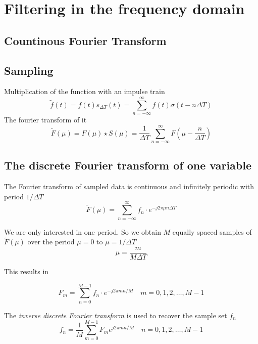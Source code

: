 \section{Filtering in the frequency domain }
\subsection{Countinous Fourier Transform }
\subsection{Sampling }
Multiplication of the function with an impulse train
\begin{equation}
\tilde{f}(t) = f(t) s_{\Delta T}(t) = \sum_{n=-\infty}^{\infty}f(t)\sigma (t-n \Delta T)
\end{equation}
The fourier transform of it
\begin{equation}
\tilde{F}(\mu) = F(\mu) \star S(\mu) = \frac{1}{\Delta T} \sum_{n=-\infty}^{\infty}F\left(\mu - \frac{n}{\Delta T}\right)
\end{equation}

\subsection{The discrete Fourier transform of one variable }
The Fourier transform of sampled data is continuous and infinitely periodic with period $1/\Delta T$
\begin{equation}
\tilde{F}(\mu)= \sum_{n=-\infty}^{\infty} f_n \cdot e^{-j 2 \pi  \mu n \Delta T}
\end{equation}

We are only interested in one period.
So we obtain $M$ equally spaced samples of $\tilde{F}(\mu)$ over the period $\mu = 0$ to $\mu = 1/\Delta T$
\begin{equation}
\mu = \frac{m}{M \Delta T}
\end{equation}

This results in

\begin{equation}
F_m = \sum_{n=0}^{M-1} f_n \cdot e^{-j 2 \pi m n / M} \quad m = 0,1,2,\dots,M-1
\end{equation}
 
The \emph{inverse discrete Fourier transform} is used to recover the sample set ${f_n}$
\begin{equation}
f_n = \frac{1}{M} \sum_{m=0}^{M-1}F_m e^{j 2 \pi m n / M} \quad n = 0,1,2,\dots,M-1
\end{equation}

